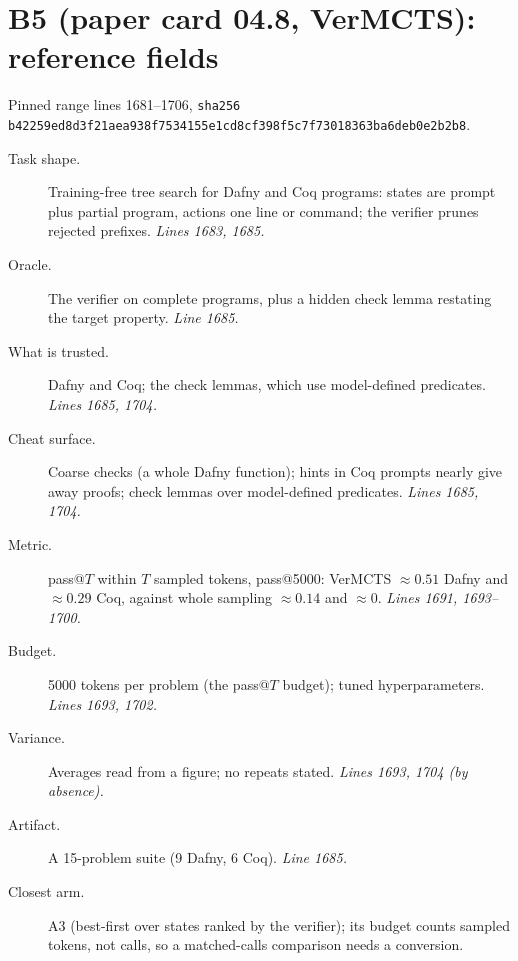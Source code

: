 \documentclass[11pt]{article}
\begin{document}
\section*{B5 (paper card 04.8, VerMCTS): reference fields}
Pinned range lines 1681--1706,
\texttt{sha256 b42259ed8d3f21aea938f7534155e1cd8cf398f5c7f73018363ba6deb0e2b2b8}.
\begin{description}
\item[Task shape.] Training-free tree search for Dafny and Coq programs: states
  are prompt plus partial program, actions one line or command; the verifier
  prunes rejected prefixes. \emph{Lines 1683, 1685.}
\item[Oracle.] The verifier on complete programs, plus a hidden check lemma
  restating the target property. \emph{Line 1685.}
\item[What is trusted.] Dafny and Coq; the check lemmas, which use
  model-defined predicates. \emph{Lines 1685, 1704.}
\item[Cheat surface.] Coarse checks (a whole Dafny function); hints in Coq
  prompts nearly give away proofs; check lemmas over model-defined
  predicates. \emph{Lines 1685, 1704.}
\item[Metric.] pass@$T$ within $T$ sampled tokens, pass@5000: VerMCTS
  $\approx 0.51$ Dafny and $\approx 0.29$ Coq, against whole sampling $\approx
  0.14$ and $\approx 0$. \emph{Lines 1691, 1693--1700.}
\item[Budget.] 5000 tokens per problem (the pass@$T$ budget); tuned
  hyperparameters. \emph{Lines 1693, 1702.}
\item[Variance.] Averages read from a figure; no repeats stated. \emph{Lines
  1693, 1704 (by absence).}
\item[Artifact.] A 15-problem suite (9 Dafny, 6 Coq). \emph{Line 1685.}
\item[Closest arm.] A3 (best-first over states ranked by the verifier); its
  budget counts sampled tokens, not calls, so a matched-calls comparison
  needs a conversion.
\end{description}
\end{document}
